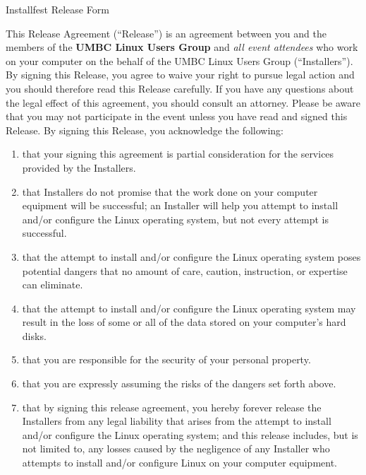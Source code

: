 \documentclass[11pt,draft]{article}
\def\TheRelease{Release}
\def\TheInstallers{Installers}
\def\AnInstaller{Installer}
\begin{document}
\begin{center} \LARGE
    Installfest Release Form
\end{center}

\vspace{1em}

This Release Agreement (``\TheRelease'') is an agreement between you and
the members of the \textbf{UMBC Linux Users Group} and \emph{all event
attendees} who work on your computer on the behalf of the UMBC Linux
Users Group (``\TheInstallers''). By signing this Release, you agree to
waive your right to pursue legal action and you should therefore read
this \TheRelease{} carefully. If you have any questions about the legal
effect of this agreement, you should consult an attorney. Please be
aware that you may not participate in the event unless you have read and
signed this \TheRelease. By signing this \TheRelease{}, you acknowledge
the following:

\begin{enumerate}
\item that your signing this agreement is partial consideration for the
    services provided by the \TheInstallers{}.

\item that \TheInstallers{} do not promise that the work done on your
    computer equipment will be successful; an \AnInstaller{} will help
    you attempt to install and/or configure the Linux operating system,
    but not every attempt is successful.

\item that the attempt to install and/or configure the Linux operating
    system poses potential dangers that no amount of care, caution,
    instruction, or expertise can eliminate.

\item that the attempt to install and/or configure the Linux operating
    system may result in the loss of some or all of the data stored on
    your computer's hard disks.

\item that you are responsible for the security of your personal
    property.

\item that you are expressly assuming the risks of the dangers set forth
    above.

\item that by signing this release agreement, you hereby forever release
    the \TheInstallers{} from any legal liability that arises from the
    attempt to install and/or configure the Linux operating system; and
    this release includes, but is not limited to, any losses caused by
    the negligence of any \AnInstaller{} who attempts to install and/or
    configure Linux on your computer equipment.

\end{enumerate}
\end{document}
